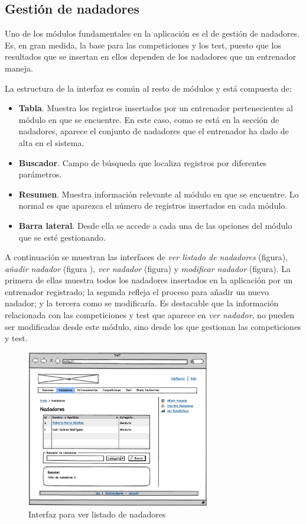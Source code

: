 	
	\subsection{Gestión de nadadores} %
		\label{sub:gestion_de_nadadores}
	
	Uno de los módulos fundamentales en la aplicación es el de gestión de nadadores. Es, en gran medida, la base para las competiciones y los test, puesto que los resultados que se insertan en ellos dependen de los nadadores que un entrenador maneja. 
	
	La estructura de la interfaz es común al resto de módulos y está compuesta de:
		
	\begin{itemize}
		\item {{\bf Tabla}. Muestra los registros insertados por un entrenador pertenecientes al módulo en que se encuentre. En este caso, como se está en la sección de nadadores, aparece el conjunto de nadadores que el entrenador ha dado de alta en el sistema.}
		\item {{\bf Buscador}. Campo de búsqueda que localiza registros por diferentes parámetros.}
		\item {{\bf Resumen}. Muestra información relevante al módulo en que se encuentre. Lo normal es que aparezca el número de registros insertados en cada módulo.}
		\item {{\bf Barra lateral}. Desde ella se accede a cada una de las opciones del módulo que se esté gestionando.}
	\end{itemize}
	
	A continuación se muestran las interfaces de {\it ver listado de nadadores} (figura), {\it añadir nadador} (figura ), {\it ver nadador} (figura) y {\it modificar nadador} (figura). La primera de ellas muestra todos los nadadores insertados en la aplicación por un entrenador registrado; la segunda refleja el proceso para añadir un nuevo nadador; y la tercera como se modificaría. Es destacable que la información relacionada con las competiciones y test que aparece en {\it ver nadador}, no pueden ser modificadas desde este módulo, sino desde los que gestionan las competiciones y test.
	
	\begin{figure}[H]
	  \centering
	    \includegraphics[width=8cm]{./eps/10_Nadadores.eps}
	  \caption{Interfaz para ver listado de nadadores}
	  \label{fig:interfaz_nadadores}
	\end{figure}
	
